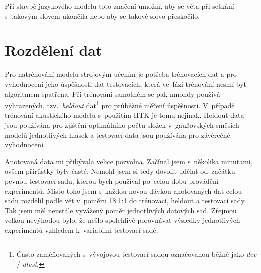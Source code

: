 Při stavbě jazykového modelu toto značení umožní, aby se věta při setkání
s~takovým slovem ukončila nebo aby se takové slovo přeskočilo.

%
%
%
%

\section{Rozdělení dat}
\label{sec:asr:rozdeleni-dat}

Pro natrénování modelu strojovým učením je potřeba trénovacích dat a pro
vyhodnocení jeho úspěšnosti dat testovacích, která ve~fázi trénování nesmí být
algoritmem spatřena. Při trénování samotném se pak mnohdy používá vyhrazených,
tzv.~\textit{heldout} dat\footnote{Často zaměňovaných s~vývojovou testovací sadou
označovanou běžně jako \textit{dev} / \textit{dtest}.} pro průběžné měření úspěšnosti. V~případě trénování
akustického modelu s~použitím HTK je tomu nejinak. Heldout data jsou používána
pro zjištění optimálního počtu složek v~gaußovských směsích modelů jednotlivých hlásek a testovací
data jsou používána pro závěrečné vyhodnocení.

Anotovaná data mi přibývala velice pozvolna. Začínal jsem s~několika minutami,
ovšem přírůstky byly časté. Nemohl jsem si tedy dovolit udělat od~začátku pevnou
testovací sadu, kterou bych používal po~celou dobu provádění experimentů. Místo
toho jsem s~každou novou dávkou anotovaných dat celou sadu rozdělil podle vět
v~poměru 18:1:1 do trénovací, heldout a testovací sady. Tak jsem měl neustále
vyvážený poměr jednotlivých datových sad. Zřejmou velkou nevýhodou bylo, že
nešlo spolehlivě porovnávat výsledky jednotlivých experimentů vzhledem
k~variabilní testovací sadě.

